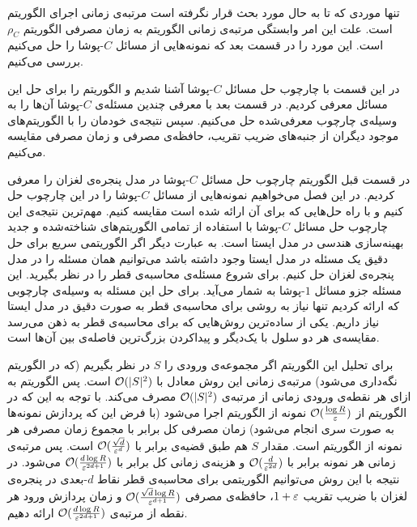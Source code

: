  تنها موردی که تا به حال مورد بحث قرار نگرفته است مرتبه‌ی زمانی اجرای الگوریتم است. علت این امر وابستگی مرتبه‌ی زمانی الگوریتم‌  به زمان مصرفی الگوریتم $\rho_C$ است. این مورد را در قسمت بعد که نمونه‌هایی از مسائل $C$-پوشا را حل می‌کنیم بررسی می‌کنیم.
 
 در این قسمت با چارچوب حل مسائل $C$-پوشا آشنا شدیم و الگوریتم  را برای حل این مسائل معرفی کردیم. در قسمت بعد با معرفی چندین مسئله‌ی $C$-پوشا آن‌ها را به وسیله‌ی چارچوب معرفی‌شده حل می‌کنیم.  سپس  نتیجه‌ی خودمان را با الگوریتم‌های موجود دیگران از جنبه‌های ضریب تقریب، حافظه‌ی مصرفی و زمان مصرفی مقایسه می‌کنیم.
 
در قسمت قبل الگوریتم چارچوب حل مسائل $C$-پوشا در مدل پنجره‌ی لغزان را معرفی کردیم. در این فصل می‌خواهیم نمونه‌هایی از مسائل $C$-پوشا را در این چارچوب حل کنیم و با راه حل‌‌هایی که برای آن ارائه شده است مقایسه کنیم. مهم‌ترین نتیجه‌ی این چارچوب حل مسائل $C$-پوشا با استفاده از تمامی الگوریتم‌های شناخته‌شده و جدید بهینه‌سازی هندسی در مدل ایستا است. به عبارت دیگر اگر الگوریتمی سریع برای حل دقیق یک مسئله‌ در مدل ایستا وجود داشته باشد می‌توانیم همان مسئله را در مدل پنجره‌ی لغزان حل کنیم.
برای شروع مسئله‌ی محاسبه‌ی قطر را در نظر بگیرید. این مسئله جزو مسائل $1$-پوشا به شمار می‌آید. برای حل این مسئله به وسیله‌ی چارچوبی که ارائه کردیم تنها نیاز به روشی برای محاسبه‌ی قطر به صورت دقیق در مدل ایستا نیاز داریم.
یکی از ساده‌ترین روش‌هایی که برای محاسبه‌ی قطر به ذهن می‌رسد مقایسه‌ی هر دو سلول با یک‌دیگر و پیدا‌کردن بزرگ‌ترین‌ فاصله‌ی بین آن‌ها است.

برای تحلیل این الگوریتم اگر مجموعه‌ی ورودی را $S$ در نظر بگیریم (که در الگوریتم  نگه‌داری می‌شود) مرتبه‌ی زمانی این روش معادل با 
$\mathcal{O}(|S|^2)$
است. پس الگوریتم  به ازای هر نقطه‌ی ورودی زمانی از مرتبه‌ی $\mathcal{O}(|S|^2)$ مصرف می‌کند. با توجه به این که در الگوریتم  از 
$\mathcal{O}(\frac{\log R}{\varepsilon})$
نمونه از الگوریتم  اجرا می‌شود (با فرض این که پردازش نمونه‌ها به صورت سری انجام می‌شود) زمان مصرفی کل برابر با مجموع زمان مصرفی هر نمونه از الگوریتم است. مقدار $S$ هم طبق قضیه‌ی  برابر با
$\mathcal{O}(\frac{\sqrt{d}}{\varepsilon^d})$
	است. پس مرتبه‌ی زمانی هر نمونه برابر با
$\mathcal{O}(\frac{d}{\varepsilon^{2d}})$
	و هزینه‌ی زمانی کل برابر با
$\mathcal{O}(\frac{d \log R}{\varepsilon^{2d+1}})$
	می‌شود.
 در نتیجه با این روش می‌توانیم الگوریتمی برای محاسبه‌ی قطر نقاط $d$-بعدی در پنجره‌ی لغزان با ضریب تقریب $1+\varepsilon$، حافظه‌ی مصرفی 
 $\mathcal{O}(\frac{\sqrt{d} \log R}{\varepsilon^{d+1}})$
  و زمان پردازش ورود هر نقطه از مرتبه‌ی
   $\mathcal{O}(\frac{d \log R}{\varepsilon^{2d+1}})$
   	 ارائه دهیم.
   	 
